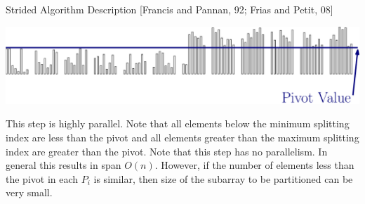 \documentclass[xcolor=x11names, svgnames, rgb]{beamer}
\newtheorem{defin}{Definition}
\begin{document}
\begin{frame}[t]{Strided Algorithm Description [Francis and Pannan, 92; Frias and Petit, 08]}
\begin{overprint}
	\includegraphics[width=\linewidth]{imgs/stridedAlgSim5Ann.eps}
	\end{overprint}
	\vspace{0.25cm}
	\begin{overprint}
	This step is highly parallel.
	\onslide<4>Note that all elements below the minimum splitting index are less than the pivot and all elements greater than the maximum splitting index are greater than the pivot.
	\onslide<5> Note that this step has no parallelism. In general this results in span $O(n)$. However, if the number of elements less than the pivot in each $P_i$ is similar, then size of the subarray to be partitioned can be very small.
	\end{overprint}
	
\end{frame}

\end{document}
